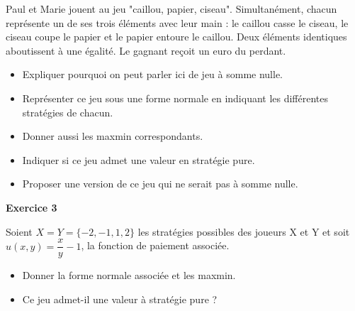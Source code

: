 \documentclass[12pt]{article}
\begin{document}
Paul et Marie jouent au jeu "caillou, papier, ciseau". Simultan\'ement, chacun repr\'esente un de ses trois \'el\'ements avec leur main : le caillou casse le ciseau, le ciseau coupe le papier et le papier entoure le caillou. 
Deux \'el\'ements identiques aboutissent \`a une \'egalit\'e. Le gagnant re\c coit un euro du perdant.
\begin{itemize}
\item Expliquer pourquoi on peut parler ici de jeu \`a somme nulle. 
\item Repr\'esenter ce jeu sous une forme normale en indiquant les diff\'erentes strat\'egies de chacun. 
\item Donner aussi les maxmin correspondants. 
\item Indiquer si ce jeu admet une valeur en strat\'egie pure.
\item Proposer une version de ce jeu qui ne serait pas \`a somme nulle.
\end{itemize}


\medskip

\medskip

\begin{center}
 \textbf{Exercice 3}\\
\end{center}


\medskip
Soient $X=Y=\{-2,-1,1,2\}$ les strat\'egies possibles des joueurs X et Y et soit $u(x,y)=\dfrac{x}{y}-1$, la fonction de paiement associ\'ee.
\begin{itemize}
\item Donner la forme normale associ\'ee et les maxmin.
\item Ce jeu admet-il une valeur \`a strat\'egie pure ?
\end{itemize}
\end{document}
